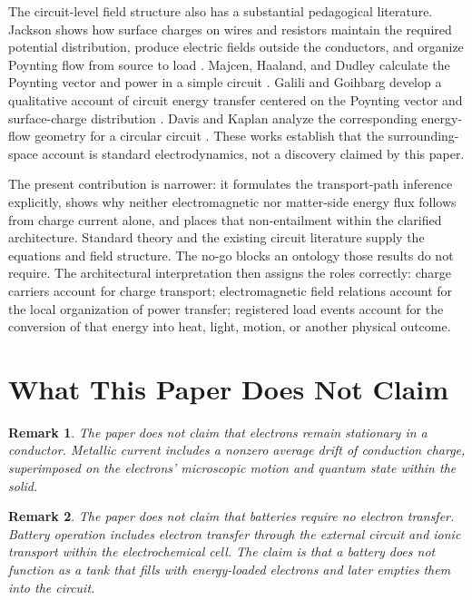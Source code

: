 \documentclass[12pt,onecolumn]{article}
\newtheorem{remark}{Remark}
\begin{document}
The circuit-level field structure also has a substantial pedagogical literature. Jackson shows how surface charges on wires and resistors maintain the required potential distribution, produce electric fields outside the conductors, and organize Poynting flow from source to load \cite{jackson1996}. Majcen, Haaland, and Dudley calculate the Poynting vector and power in a simple circuit \cite{majcen2000}. Galili and Goihbarg develop a qualitative account of circuit energy transfer centered on the Poynting vector and surface-charge distribution \cite{galili2005}. Davis and Kaplan analyze the corresponding energy-flow geometry for a circular circuit \cite{davis2011}. These works establish that the surrounding-space account is standard electrodynamics, not a discovery claimed by this paper.

The present contribution is narrower: it formulates the transport-path inference explicitly, shows why neither electromagnetic nor matter-side energy flux follows from charge current alone, and places that non-entailment within the clarified architecture. Standard theory and the existing circuit literature supply the equations and field structure. The no-go blocks an ontology those results do not require. The architectural interpretation then assigns the roles correctly: charge carriers account for charge transport; electromagnetic field relations account for the local organization of power transfer; registered load events account for the conversion of that energy into heat, light, motion, or another physical outcome.


\section{What This Paper Does Not Claim}

\begin{remark}
The paper does not claim that electrons remain stationary in a conductor. Metallic current includes a nonzero average drift of conduction charge, superimposed on the electrons' microscopic motion and quantum state within the solid.
\end{remark}

\begin{remark}
The paper does not claim that batteries require no electron transfer. Battery operation includes electron transfer through the external circuit and ionic transport within the electrochemical cell. The claim is that a battery does not function as a tank that fills with energy-loaded electrons and later empties them into the circuit.
\end{remark}
\end{document}

